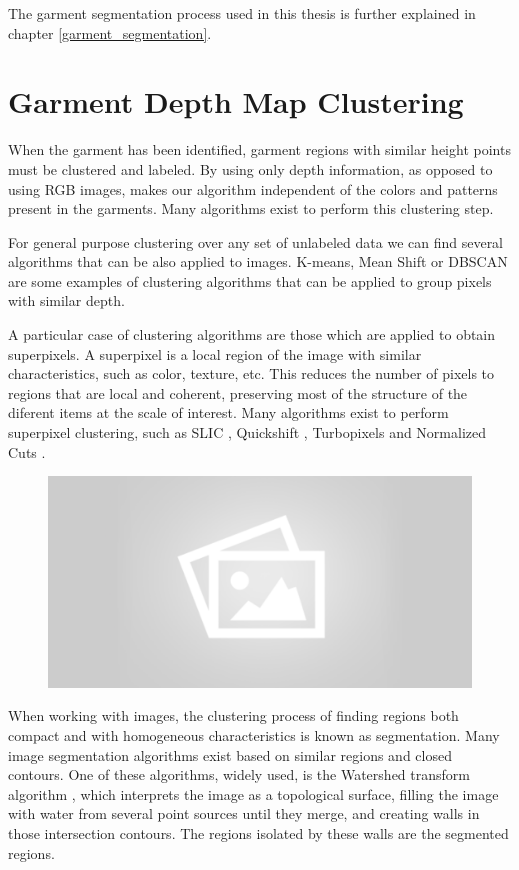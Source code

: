 The garment segmentation process used in this thesis is further explained in chapter \ref{garment_segmentation}.

\section{Garment Depth Map Clustering}
When the garment has been identified, garment regions with similar height points must be clustered and labeled. By using only depth information, as opposed to using RGB images, makes our algorithm independent of the colors and patterns present in the garments. Many algorithms exist to perform this clustering step.

For general purpose clustering over any set of unlabeled data we can find several algorithms that can be also applied to images. K-means, Mean Shift  or DBSCAN  are some examples of clustering algorithms that can be applied to group pixels with similar depth.

A particular case of clustering algorithms are those which are applied to obtain superpixels. A superpixel  is a local region of the image with similar characteristics, such as color, texture, etc. This reduces the number of pixels to regions that are local and coherent, preserving most of the structure of the diferent items at the scale of interest. Many algorithms exist to perform superpixel clustering, such as SLIC , Quickshift , Turbopixels  and Normalized Cuts .

\begin{figure}[thpb]
    \centering
    \includegraphics[width=0.8
    \textwidth]{figures/placeholder2.png}
    \caption{}
    \label{fig:generic_superpixels}
\end{figure}

When working with images, the clustering process of finding regions both compact and with homogeneous characteristics is known as segmentation. Many image segmentation algorithms exist based on similar regions and closed contours. One of these algorithms, widely used, is the Watershed transform algorithm , which interprets the image as a topological surface, filling the image with water from several point sources until they merge, and creating walls in those intersection contours. The regions isolated by these walls are the segmented regions.

